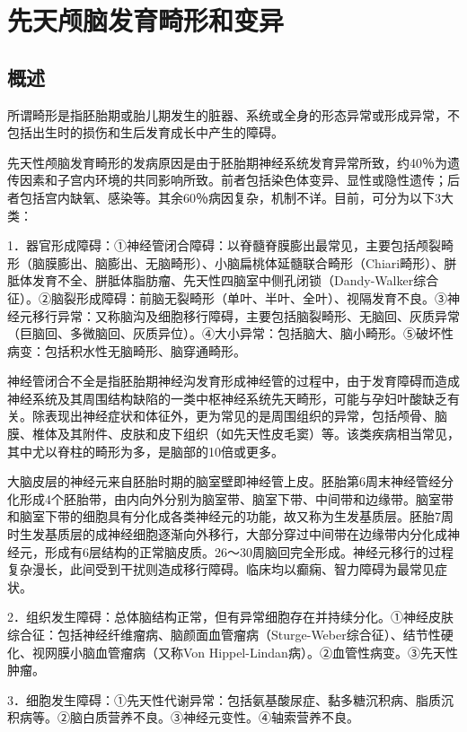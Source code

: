 \section{先天颅脑发育畸形和变异}

\subsection{概述}

所谓畸形是指胚胎期或胎儿期发生的脏器、系统或全身的形态异常或形成异常，不包括出生时的损伤和生后发育成长中产生的障碍。

先天性颅脑发育畸形的发病原因是由于胚胎期神经系统发育异常所致，约40％为遗传因素和子宫内环境的共同影响所致。前者包括染色体变异、显性或隐性遗传；后者包括宫内缺氧、感染等。其余60％病因复杂，机制不详。目前，可分为以下3大类：

1．器官形成障碍：①神经管闭合障碍：以脊髓脊膜膨出最常见，主要包括颅裂畸形（脑膜膨出、脑膨出、无脑畸形）、小脑扁桃体延髓联合畸形（Chiari畸形）、胼胝体发育不全、胼胝体脂肪瘤、先天性四脑室中侧孔闭锁（Dandy-Walker综合征）。②脑裂形成障碍：前脑无裂畸形（单叶、半叶、全叶）、视隔发育不良。③神经元移行异常：又称脑沟及细胞移行障碍，主要包括脑裂畸形、无脑回、灰质异常（巨脑回、多微脑回、灰质异位）。④大小异常：包括脑大、脑小畸形。⑤破坏性病变：包括积水性无脑畸形、脑穿通畸形。

神经管闭合不全是指胚胎期神经沟发育形成神经管的过程中，由于发育障碍而造成神经系统及其周围结构缺陷的一类中枢神经系统先天畸形，可能与孕妇叶酸缺乏有关。除表现出神经症状和体征外，更为常见的是周围组织的异常，包括颅骨、脑膜、椎体及其附件、皮肤和皮下组织（如先天性皮毛窦）等。该类疾病相当常见，其中尤以脊柱的畸形为多，是脑部的10倍或更多。

大脑皮层的神经元来自胚胎时期的脑室壁即神经管上皮。胚胎第6周末神经管经分化形成4个胚胎带，由内向外分别为脑室带、脑室下带、中间带和边缘带。脑室带和脑室下带的细胞具有分化成各类神经元的功能，故又称为生发基质层。胚胎7周时生发基质层的成神经细胞逐渐向外移行，大部分穿过中间带在边缘带内分化成神经元，形成有6层结构的正常脑皮质。26～30周脑回完全形成。神经元移行的过程复杂漫长，此间受到干扰则造成移行障碍。临床均以癫痫、智力障碍为最常见症状。

2．组织发生障碍：总体脑结构正常，但有异常细胞存在并持续分化。①神经皮肤综合征：包括神经纤维瘤病、脑颜面血管瘤病（Sturge-Weber综合征）、结节性硬化、视网膜小脑血管瘤病（又称Von
Hippel-Lindan病）。②血管性病变。③先天性肿瘤。

3．细胞发生障碍：①先天性代谢异常：包括氨基酸尿症、黏多糖沉积病、脂质沉积病等。②脑白质营养不良。③神经元变性。④轴索营养不良。

